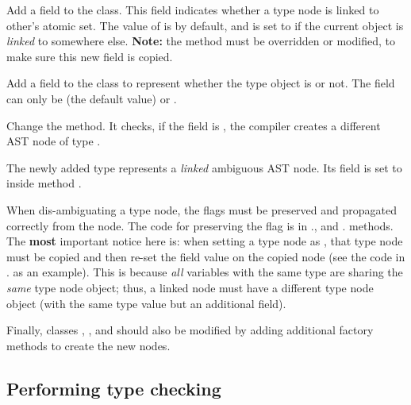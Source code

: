 \documentclass{article}
\begin{document}
\begin{enumerate}

\Item Add a  field to the  class. This field indicates whether a type node is linked to other's atomic set. The value of  is  by default, and is set to  if the current object is \textit{linked} to somewhere else. \textbf{Note:} the  method must be overridden or modified, to make sure this new  field is copied.

\Item Add a  field to the  class to represent whether the type object is  or not. The  field can only be  (the default value) or .

\Item Change the  method. It checks, if the  field is , the compiler creates a different AST node of type .

\Item The newly added  type represents a \textit{linked} ambiguous AST node. Its  field is set to  inside method .

\Item When dis-ambiguating a type node, the  flags must be preserved and propagated correctly from the  node.  The code for preserving the  flag is in .,  and . methods. The \textbf{most} important notice here is: when setting a type node as ,  that type node must be copied and then re-set the field value on the copied node (see the code in . as an example). This is because \textit{all} variables with the same type are sharing the \textit{same} type node object; thus, a linked  node must have a different type node object (with the same type value but an additional  field).

\Item Finally, classes , , and  should also be modified by adding additional factory methods to create the new  nodes.

\end{enumerate}



\subsection{Performing type checking}
\label{sec:typechecking}
\end{document}
